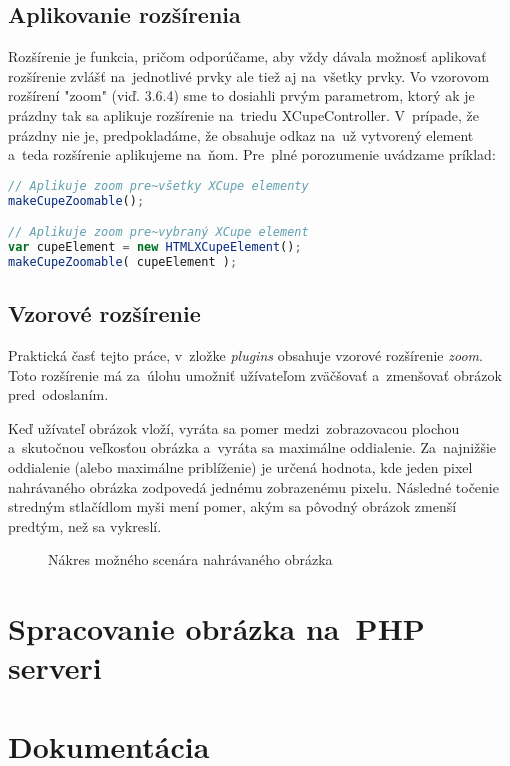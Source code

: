 \subsection{Aplikovanie rozšírenia}

Rozšírenie je funkcia, pričom odporúčame, aby vždy dávala možnosť aplikovať rozšírenie zvlášť na~jednotlivé prvky ale tiež aj na~všetky prvky. Vo vzorovom rozšírení "zoom" (viď. 3.6.4) sme to dosiahli prvým parametrom, ktorý ak je prázdny tak sa aplikuje rozšírenie na~triedu XCupeController. V~prípade, že prázdny nie je, predpokladáme, že obsahuje odkaz na~už vytvorený element a~teda rozšírenie aplikujeme na~ňom. Pre~plné porozumenie uvádzame príklad:

\begin{lstlisting}[language=JavaScript]
// Aplikuje zoom pre~všetky XCupe elementy
makeCupeZoomable();

// Aplikuje zoom pre~vybraný XCupe element
var cupeElement = new HTMLXCupeElement();
makeCupeZoomable( cupeElement );
\end{lstlisting}

\subsection{Vzorové rozšírenie}

Praktická časť tejto práce, v~zložke \emph{plugins} obsahuje vzorové rozšírenie \emph{zoom}. Toto rozšírenie má za~úlohu umožniť užívateľom zväčšovať a~zmenšovať obrázok pred~odoslaním.

Keď užívateľ obrázok vloží, vyráta sa pomer medzi~zobrazovacou plochou a~skutočnou veľkosťou obrázka a~vyráta sa maximálne oddialenie. Za~najnižšie oddialenie (alebo maximálne priblíženie) je určená hodnota, kde jeden pixel nahrávaného obrázka zodpovedá jednému zobrazenému pixelu. Následné točenie stredným stlačídlom myši mení pomer, akým sa pôvodný obrázok zmenší predtým, než sa vykreslí.

\begin{figure}[!hb]
	\centering
	\caption{Nákres možného scenára nahrávaného obrázka}
\end{figure}

\section{Spracovanie obrázka na~PHP serveri}
\section{Dokumentácia}